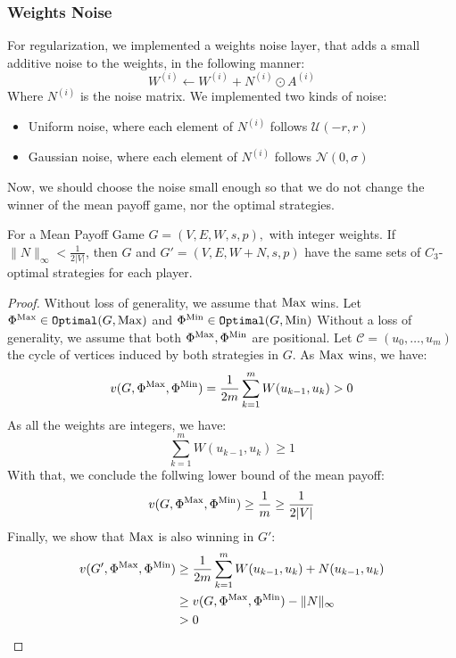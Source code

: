 \subsubsection{Weights Noise}
For regularization, we implemented a weights noise layer, that adds a small additive noise to the weights, in the following manner:
\begin{equation*}
		W^{(i)}\leftarrow W^{(i)} + N^{(i)} \odot A^{(i)}
\end{equation*}
Where $N^{(i)}$ is the noise matrix. We implemented two kinds of noise:
\begin{itemize}
	\item Uniform noise, where each element of $N^{(i)}$ follows $\mathcal{U}(-r,r)$
	\item Gaussian noise, where each element of $N^{(i)}$ follows $\mathcal{N}(0,\sigma)$
\end{itemize}
Now, we should choose the noise small enough so that we do not change the winner of the mean payoff game, nor the optimal strategies.
\begin{theorem}
	For a Mean Payoff Game $G=(V,E,W,s,p),$ with integer weights. 
	\newline If $\lVert N\rVert_{\infty} < \frac{1}{2\lvert V \rvert}$, then $G$ and $G'=(V,E,W+N,s,p)$ have the same sets of $C_3$-optimal strategies for each player.
\end{theorem}
\begin{proof}
	Without loss of generality, we assume that $\operatorname{Max}$ wins.
	\newline Let $\Phi^{\operatorname{Max}}\in \mathtt{Optimal}(G,\operatorname{Max})$ and $\Phi^{\operatorname{Min}}\in \mathtt{Optimal}(G,\operatorname{Min})$ \newline Without a loss of generality, we assume that both $\Phi^{\operatorname{Max}},\Phi^{\operatorname{Min}}$ are positional.
	\newline Let $\mathcal{C}=(u_0,\dots,u_{m})$ the cycle of vertices induced by both strategies in $G.$ 
	\newline As $\operatorname{Max}$ wins, we have:
	\begin{equation*}
		v(G,\Phi^{\operatorname{Max}},\Phi^{\operatorname{Min}}) = \frac{1}{2m}\sum_{k=1}^{m}W(u_{k-1},u_{k}) > 0
	\end{equation*}
	As all the weights are integers, we have:
	\begin{equation*}
		\sum_{k=1}^{m}W(u_{k-1},u_{k}) \ge 1
	\end{equation*}
	With that, we conclude the follwing lower bound of the mean payoff:
	\begin{equation*}
		v(G,\Phi^{\operatorname{Max}},\Phi^{\operatorname{Min}}) \ge \frac{1}{m} \ge \frac{1}{2\lvert V \rvert} 
	\end{equation*}
	Finally, we show that $\operatorname{Max}$ is also winning in $G'$:
	\begin{align*}
		 v(G',\Phi^{\operatorname{Max}},\Phi^{\operatorname{Min}})  & \ge \frac{1}{2m}\sum_{k=1}^{m}W(u_{k-1},u_{k}) + N(u_{k-1},u_{k}) \\
		 &\ge v(G,\Phi^{\operatorname{Max}},\Phi^{\operatorname{Min}}) - \lVert N \rVert_{\infty} \\
		 & > 0
	\end{align*}
\end{proof}
